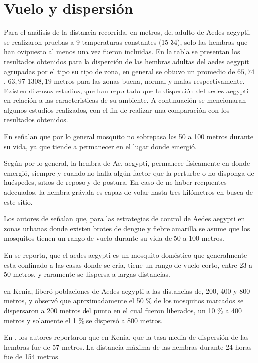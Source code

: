 \section{Vuelo y dispersión}
Para el análisis de la distancia recorrida, en metros, del adulto de Aedes aegypti, se realizaron
pruebas a 9 temperaturas constantes (15-34\textcelsius), solo las hembras que han ovipuesto al
menos una vez fueron incluidas. En la tabla  se presentan los
resultados obtenidos para la disperción de las hembras adultas del aedes aegypit agrupadas por el
tipo su tipo de zona, en general se obtuvo un promedio de $65,74$, $63,97$ $1308,19$ metros para las zonas buena, normal y malas respectivamente. Existen diversos estudios, que han reportado que
la disperción del aedes aegypti en relación a las caracteristicas de su ambiente. A continuación
se mencionaran algunos estudios realizados, con el fin de realizar una comparación con los resultados obtenidos.

En \citet{cabezas2005dengue} señalan que por lo general mosquito no sobrepasa los 50 a 100 metros
durante su vida, ya que tiende a permanecer en el lugar donde emergió.

Según \citet{ThironIzcazaJ2003} por lo general, la hembra de Ae. aegypti, permanece físicamente en
donde emergió, siempre y cuando no halla algún factor que la perturbe o no disponga de huéspedes,
sitios de reposo y de postura. En caso de no haber recipientes adecuados, la hembra grávida es capaz de volar hasta tres kilómetros en busca de este sitio.

Los autores de \citet{dengueUruguayCap8} señalan que, para las estrategias de control de Aedes
aegypti en zonas urbanas donde existen brotes de dengue y fiebre amarilla se asume que los
mosquitos tienen un rango de vuelo durante su vida de 50 a 100 metros.

En \citet{luevano1993ciclo} se reporta, que el aedes aegypti es un mosquito doméstico que
generalmente esta confinado a las casas donde se cria, tiene un rango de vuelo corto, entre 23 a 50 metros, y raramente se dispersa a largas distancias.

\citet{mcdonald1977population} en Kenia, liberó poblaciones de Aedes aegypti a las distancias de,
200, 400 y 800 metros, y observó que aproximadamente el 50 \% de los mosquitos marcados se
dispersaron a 200 metros del punto en el cual fueron liberados, un 10 \% a 400 metros y solamente
el 1 \% se dispersó a 800 metros.

En \citet{trpis1986dispersal}, los autores reportaron que en Kenia, que la tasa media de dispersión
de las hembras fue de 57 metros. La distancia máxima de las hembras durante 24 horas fue de 154
metros.

